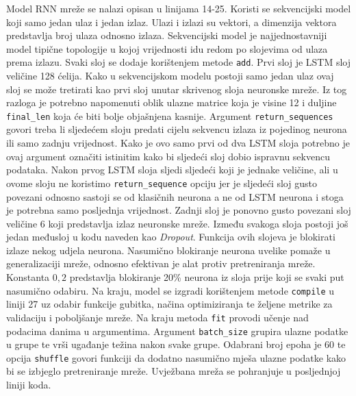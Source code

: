 \documentclass[times, utf8, diplomski]{fer}
\begin{document}
Model RNN mreže se nalazi opisan u linijama 14-25. Koristi se sekvencijski model koji samo jedan
ulaz i jedan izlaz. Ulazi i izlazi su vektori, a dimenzija vektora predstavlja broj ulaza odnosno izlaza.
Sekvencijski model je najjednostavniji model tipične topologije u kojoj vrijednosti idu redom po slojevima
od ulaza prema izlazu. Svaki sloj se dodaje korištenjem metode \texttt{add}. Prvi sloj je LSTM sloj veličine
128 ćelija. Kako u sekvencijskom modelu postoji samo jedan ulaz ovaj sloj se može tretirati kao prvi sloj
unutar skrivenog sloja neuronske mreže. Iz tog razloga je potrebno napomenuti oblik ulazne matrice koja je
visine 12 i duljine \texttt{final\_len} koja će biti bolje objašnjena kasnije. Argument \texttt{return\_sequences}
govori treba li sljedećem sloju predati cijelu sekvencu izlaza iz pojedinog neurona ili samo zadnju vrijednost.
Kako je ovo samo prvi od dva LSTM sloja potrebno je ovaj argument označiti istinitim kako bi sljedeći sloj
dobio ispravnu sekvencu podataka. Nakon prvog LSTM sloja sljedi sljedeći koji je jednake veličine, ali u ovome
sloju ne koristimo \texttt{return\_sequence} opciju jer je sljedeći sloj gusto povezani odnosno sastoji se od
klasičnih neurona a ne od LSTM neurona i stoga je potrebna samo posljednja vrijednost. Zadnji sloj je ponovno
gusto povezani sloj veličine 6 koji predstavlja izlaz neuronske mreže. Između svakoga sloja postoji još jedan
međusloj u kodu naveden kao \textit{Dropout}. Funkcija ovih slojeva je blokirati izlaze nekog udjela neurona.
Nasumično blokiranje neurona uvelike pomaže u generalizaciji mreže, odnosno efektivan je alat protiv pretreniranja
mreže. Konstanta $0,2$ predstavlja blokiranje 20\% neurona iz sloja prije koji se svaki put nasumično odabiru. Na kraju,
model se izgradi korištenjem metode \texttt{compile} u liniji 27 uz odabir funkcije gubitka, načina optimiziranja
te željene metrike za validaciju i poboljšanje mreže. Na kraju metoda \texttt{fit} provodi učenje nad podacima
danima u argumentima. Argument \texttt{batch\_size} grupira ulazne podatke u grupe te vrši ugađanje težina
nakon svake grupe. Odabrani broj epoha je 60 te opcija \texttt{shuffle} govori funkciji da
dodatno nasumično mješa ulazne podatke
kako bi se izbjeglo pretreniranje mreže. Uvježbana mreža se pohranjuje u posljednjoj liniji koda.
\end{document}
